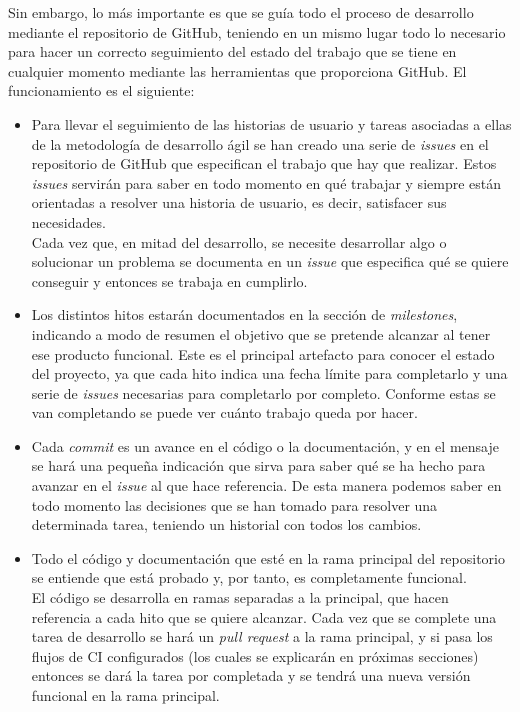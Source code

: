 Sin embargo, lo más importante es que se guía todo el proceso de desarrollo
mediante el repositorio de GitHub, teniendo en un mismo lugar todo lo necesario
para hacer un correcto seguimiento del estado del trabajo que se tiene en
cualquier momento mediante las herramientas que proporciona GitHub. El
funcionamiento es el siguiente:
\begin{itemize}
    \item Para llevar el seguimiento de las historias de usuario y tareas
    asociadas a ellas de la metodología de desarrollo ágil se han creado una
    serie de \textit{issues} en el repositorio de GitHub que especifican el
    trabajo que hay que realizar. Estos \textit{issues} servirán para saber en
    todo momento en qué trabajar y siempre están orientadas a resolver una
    historia de usuario, es decir, satisfacer sus necesidades.\\
    Cada vez que, en mitad del desarrollo, se necesite desarrollar algo o
    solucionar un problema se documenta en un \textit{issue} que especifica qué
    se quiere conseguir y entonces se trabaja en cumplirlo.
    \item Los distintos hitos estarán documentados en la sección de
    \textit{milestones}, indicando a modo de resumen el objetivo que se pretende
    alcanzar al tener ese producto funcional. Este es el principal artefacto
    para conocer el estado del proyecto, ya que cada hito indica una fecha
    límite para completarlo y una serie de \textit{issues} necesarias para
    completarlo por completo. Conforme estas se van completando se puede ver
    cuánto trabajo queda por hacer.
    \item Cada \textit{commit} es un avance en el código o la documentación, y
    en el mensaje se hará una pequeña indicación que sirva para saber qué se ha
    hecho para avanzar en el \textit{issue} al que hace referencia. De esta
    manera podemos saber en todo momento las decisiones que se han tomado para
    resolver una determinada tarea, teniendo un historial con todos los cambios.
    \item Todo el código y documentación que esté en la rama principal del
    repositorio se entiende que está probado y, por tanto, es completamente
    funcional. \\
    El código se desarrolla en ramas separadas a la principal, que hacen
    referencia a cada hito que se quiere alcanzar. Cada vez que se complete una
    tarea de desarrollo se hará un \textit{pull request} a la rama principal, y
    si pasa los flujos de CI configurados (los cuales se explicarán en próximas
    secciones) entonces se dará la tarea por completada y se tendrá una nueva
    versión funcional en la rama principal. 
\end{itemize}

